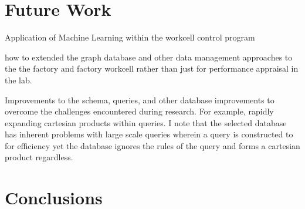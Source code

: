 \documentclass[english]{spimubphdthesis}
\begin{document}
\section{Future Work}
Application of Machine Learning within the workcell control program

how to extended the graph database and other data management approaches to the the factory and factory workcell rather than just for performance appraisal in the lab.

Improvements to the schema, queries, and other database improvements to overcome the challenges encountered during research.  For example, rapidly expanding cartesian products within queries.  I note that the selected database has inherent problems with large scale queries wherein a query is constructed to for efficiency yet the database ignores the rules of the query and forms a cartesian product regardless.

\section{Conclusions}

%


\end{document}
